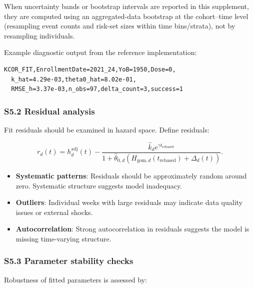 \documentclass[
]{article}
\providecommand{\tightlist}{%
  \setlength{\itemsep}{0pt}\setlength{\parskip}{0pt}}
\begin{document}
When uncertainty bands or bootstrap intervals are reported in this
supplement, they are computed using an aggregated-data bootstrap at the
cohort--time level (resampling event counts and risk-set sizes within
time bins/strata), not by resampling individuals.

Example diagnostic output from the reference implementation:

\begin{verbatim}
KCOR_FIT,EnrollmentDate=2021_24,YoB=1950,Dose=0,
  k_hat=4.29e-03,theta0_hat=8.02e-01,
  RMSE_h=3.37e-03,n_obs=97,delta_count=3,success=1
\end{verbatim}

\subsubsection{S5.2 Residual analysis}\label{s5.2-residual-analysis}

Fit residuals should be examined in hazard space. Define residuals:

\[
r_{d}(t)=h_d^{\mathrm{adj}}(t)-\frac{\hat{k}_d e^{\gamma t_{\mathrm{rebased}}}}{1+\hat{\theta}_{0,d}\left(H_{\mathrm{gom},d}(t_{\mathrm{rebased}})+\Delta_d(t)\right)}.
\]

\begin{itemize}
\tightlist
\item
  \textbf{Systematic patterns}: Residuals should be approximately random
  around zero. Systematic structure suggests model inadequacy.
\item
  \textbf{Outliers}: Individual weeks with large residuals may indicate
  data quality issues or external shocks.
\item
  \textbf{Autocorrelation}: Strong autocorrelation in residuals suggests
  the model is missing time-varying structure.
\end{itemize}

\subsubsection{S5.3 Parameter stability
checks}\label{s5.3-parameter-stability-checks}

Robustness of fitted parameters is assessed by:
\end{document}
